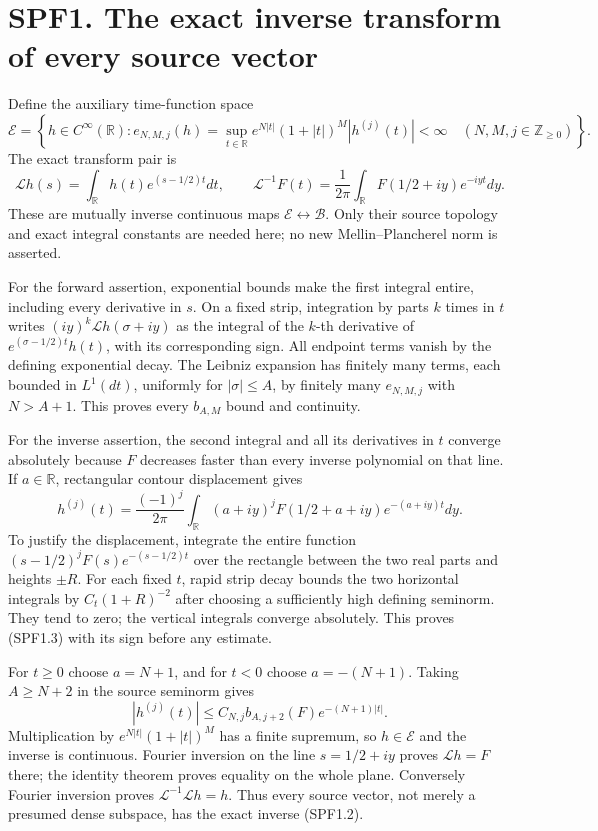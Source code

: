 \section{SPF1. The exact inverse transform of every source
vector}\label{spf1.-the-exact-inverse-transform-of-every-source-vector}

Define the auxiliary time-function space \[
\mathcal E=\left\{h\in C^\infty(\mathbb R):
e_{N,M,j}(h)=\sup_{t\in\mathbb R}
e^{N|t|}(1+|t|)^M|h^{(j)}(t)|<\infty
\quad(N,M,j\in\mathbb Z_{\ge0})\right\}.
\tag{SPF1.1}
\] The exact transform pair is \[
\mathcal Lh(s)=\int_{\mathbb R}h(t)e^{(s-1/2)t}dt,
\qquad
\mathcal L^{-1}F(t)=\frac1{2\pi}
\int_{\mathbb R}F(1/2+iy)e^{-iyt}dy.
\tag{SPF1.2}
\] These are mutually inverse continuous maps
\(\mathcal E\leftrightarrow\mathcal B\). Only their source topology and
exact integral constants are needed here; no new Mellin--Plancherel norm
is asserted.

For the forward assertion, exponential bounds make the first integral
entire, including every derivative in \(s\). On a fixed strip,
integration by parts \(k\) times in \(t\) writes
\((iy)^k\mathcal Lh(\sigma+iy)\) as the integral of the \(k\)-th
derivative of \(e^{(\sigma-1/2)t}h(t)\), with its corresponding sign.
All endpoint terms vanish by the defining exponential decay. The Leibniz
expansion has finitely many terms, each bounded in \(L^1(dt)\),
uniformly for \(|\sigma|\le A\), by finitely many \(e_{N,M,j}\) with
\(N>A+1\). This proves every \(b_{A,M}\) bound and continuity.

For the inverse assertion, the second integral and all its derivatives
in \(t\) converge absolutely because \(F\) decreases faster than every
inverse polynomial on that line. If \(a\in\mathbb R\), rectangular
contour displacement gives \[
h^{(j)}(t)=\frac{(-1)^j}{2\pi}
\int_{\mathbb R}(a+iy)^jF(1/2+a+iy)e^{-(a+iy)t}dy.
\tag{SPF1.3}
\] To justify the displacement, integrate the entire function
\((s-1/2)^jF(s)e^{-(s-1/2)t}\) over the rectangle between the two real
parts and heights \(\pm R\). For each fixed \(t\), rapid strip decay
bounds the two horizontal integrals by \(C_t(1+R)^{-2}\) after choosing
a sufficiently high defining seminorm. They tend to zero; the vertical
integrals converge absolutely. This proves (SPF1.3) with its sign before
any estimate.

For \(t\ge0\) choose \(a=N+1\), and for \(t<0\) choose \(a=-(N+1)\).
Taking \(A\ge N+2\) in the source seminorm gives \[
|h^{(j)}(t)|\le C_{N,j}b_{A,j+2}(F)e^{-(N+1)|t|}.
\tag{SPF1.4}
\] Multiplication by \(e^{N|t|}(1+|t|)^M\) has a finite supremum, so
\(h\in\mathcal E\) and the inverse is continuous. Fourier inversion on
the line \(s=1/2+iy\) proves \(\mathcal Lh=F\) there; the identity
theorem proves equality on the whole plane. Conversely Fourier inversion
proves \(\mathcal L^{-1}\mathcal Lh=h\). Thus every source vector, not
merely a presumed dense subspace, has the exact inverse (SPF1.2).

